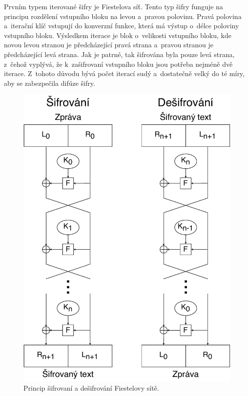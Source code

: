Prvním typem iterované šifry je Fiestelova síť. Tento typ šifry funguje na principu rozdělení vstupního bloku na levou a~pravou polovinu. Pravá polovina a~iterační klíč vstupují do konverzní funkce, která má výstup o~délce poloviny vstupního bloku. Výsledkem iterace je blok o~velikosti vstupního bloku, kde novou levou stranou je předcházející pravá strana a~pravou stranou je předcházející levá strana. Jak je patrné, tak šifrována byla pouze levá strana, z~čehož vyplývá, že k~zašifrovaní vstupního bloku jsou potřeba nejméně dvě iterace. Z~tohoto důvodu bývá počet iterací sudý a~dostatečně velký do té míry, aby se zabezpečila difúze šifry.\cite{Burda9788021446120ISBN}
\newpage
\begin{figure}[!h]
  \begin{center}
    \includegraphics[scale=0.5]{obrazky/feistelCipher.pdf}
  \end{center}
  \caption[Fiestelova síť]{Princip šifrovaní a dešifrování Fiestelovy sítě.\cite{FeistelCipher}}
  \label{img:FeistelCipher}
\end{figure}


